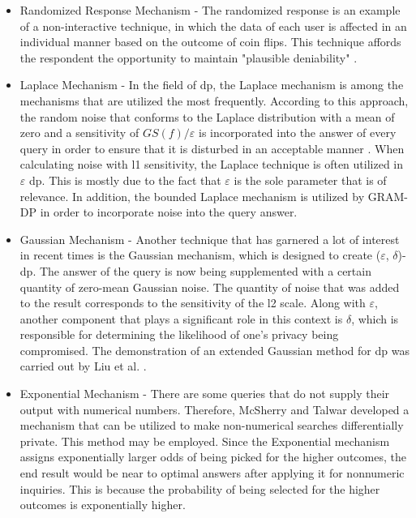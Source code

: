 \begin{itemize}
    \item Randomized Response Mechanism - The randomized response is an example of a non-interactive technique, in which the data of each user is affected in an individual manner based on the outcome of coin flips. This technique affords the respondent the opportunity to maintain "plausible deniability" \cite{RandRespMechanism}.
    \item Laplace Mechanism - In the field of \acrshort{dp}, the Laplace mechanism is among the mechanisms that are utilized the most frequently. According to this approach, the random noise that conforms to the Laplace distribution with a mean of zero and a sensitivity of $GS(f)/\varepsilon$ is incorporated into the answer of every query in order to ensure that it is disturbed in an acceptable manner \cite{LaplaceMechanism}. When calculating noise with l1 sensitivity, the Laplace technique is often utilized in $\varepsilon$ \acrshort{dp}. This is mostly due to the fact that $\varepsilon$ is the sole parameter that is of relevance. In addition, the bounded Laplace mechanism is utilized by GRAM-DP in order to incorporate noise into the query answer.
    \item Gaussian Mechanism - Another technique that has garnered a lot of interest in recent times is the Gaussian mechanism, which is designed to create ($\varepsilon$, $\delta$)-\acrshort{dp}. The answer of the query is now being supplemented with a certain quantity of zero-mean Gaussian noise. The quantity of noise that was added to the result corresponds to the sensitivity of the l2 scale. Along with $\varepsilon$, another component that plays a significant role in this context is $\delta$, which is responsible for determining the likelihood of one's privacy being compromised. The demonstration of an extended Gaussian method for \acrshort{dp} was carried out by Liu et al. \cite{GaussianMechanism}.
    \item Exponential Mechanism - There are some queries that do not supply their output with numerical numbers. Therefore, McSherry and Talwar \cite{ExpMechanism} developed a mechanism that can be utilized to make non-numerical searches differentially private. This method may be employed. Since the Exponential mechanism assigns exponentially larger odds of being picked for the higher outcomes, the end result would be near to optimal answers after applying it for nonnumeric inquiries. This is because the probability of being selected for the higher outcomes is exponentially higher.
    
\end{itemize} 

